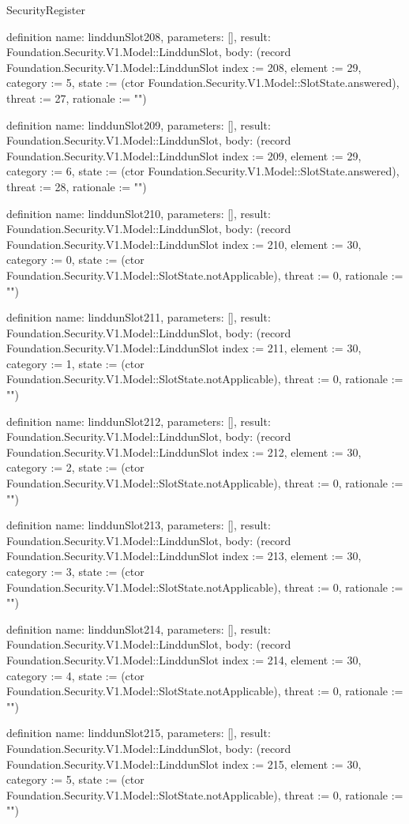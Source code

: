 \begin{lexlean}{SecurityRegister}
\begin{semanticmodule}
definition{
  name: linddunSlot208,
  parameters: [],
  result: Foundation.Security.V1.Model::LinddunSlot,
  body: (record Foundation.Security.V1.Model::LinddunSlot {index := 208, element := 29, category := 5, state := (ctor Foundation.Security.V1.Model::SlotState.answered), threat := 27, rationale := ""})
}

definition{
  name: linddunSlot209,
  parameters: [],
  result: Foundation.Security.V1.Model::LinddunSlot,
  body: (record Foundation.Security.V1.Model::LinddunSlot {index := 209, element := 29, category := 6, state := (ctor Foundation.Security.V1.Model::SlotState.answered), threat := 28, rationale := ""})
}

definition{
  name: linddunSlot210,
  parameters: [],
  result: Foundation.Security.V1.Model::LinddunSlot,
  body: (record Foundation.Security.V1.Model::LinddunSlot {index := 210, element := 30, category := 0, state := (ctor Foundation.Security.V1.Model::SlotState.notApplicable), threat := 0, rationale := ""})
}

definition{
  name: linddunSlot211,
  parameters: [],
  result: Foundation.Security.V1.Model::LinddunSlot,
  body: (record Foundation.Security.V1.Model::LinddunSlot {index := 211, element := 30, category := 1, state := (ctor Foundation.Security.V1.Model::SlotState.notApplicable), threat := 0, rationale := ""})
}

definition{
  name: linddunSlot212,
  parameters: [],
  result: Foundation.Security.V1.Model::LinddunSlot,
  body: (record Foundation.Security.V1.Model::LinddunSlot {index := 212, element := 30, category := 2, state := (ctor Foundation.Security.V1.Model::SlotState.notApplicable), threat := 0, rationale := ""})
}

definition{
  name: linddunSlot213,
  parameters: [],
  result: Foundation.Security.V1.Model::LinddunSlot,
  body: (record Foundation.Security.V1.Model::LinddunSlot {index := 213, element := 30, category := 3, state := (ctor Foundation.Security.V1.Model::SlotState.notApplicable), threat := 0, rationale := ""})
}

definition{
  name: linddunSlot214,
  parameters: [],
  result: Foundation.Security.V1.Model::LinddunSlot,
  body: (record Foundation.Security.V1.Model::LinddunSlot {index := 214, element := 30, category := 4, state := (ctor Foundation.Security.V1.Model::SlotState.notApplicable), threat := 0, rationale := ""})
}

definition{
  name: linddunSlot215,
  parameters: [],
  result: Foundation.Security.V1.Model::LinddunSlot,
  body: (record Foundation.Security.V1.Model::LinddunSlot {index := 215, element := 30, category := 5, state := (ctor Foundation.Security.V1.Model::SlotState.notApplicable), threat := 0, rationale := ""})
}


\end{semanticmodule}
\end{lexlean}

